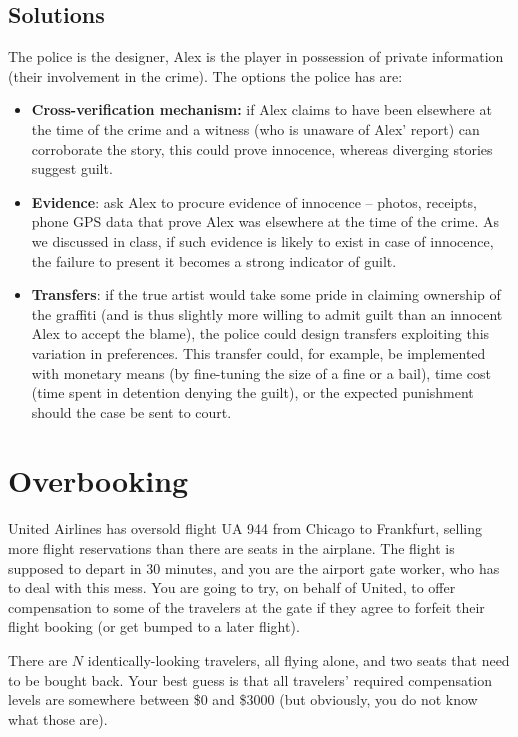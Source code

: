 \documentclass[a4paper]{article}
\begin{document}
\subsection*{Solutions}
The police is the designer, Alex is the player in possession of private information (their involvement in the crime).
The options the police has are:
\begin{itemize}
	\item \textbf{Cross-verification mechanism:} if Alex claims to have been elsewhere at the time of the crime and a witness (who is unaware of Alex' report) can corroborate the story, this could prove innocence, whereas diverging stories suggest guilt. 
	\item \textbf{Evidence}: ask Alex to procure evidence of innocence -- photos, receipts, phone GPS data that prove Alex was elsewhere at the time of the crime. As we discussed in class, if such evidence is likely to exist in case of innocence, the failure to present it becomes a strong indicator of guilt.
	\item \textbf{Transfers}: if the true artist would take some pride in claiming ownership of the graffiti (and is thus slightly more willing to admit guilt than an innocent Alex to accept the blame), the police could design transfers exploiting this variation in preferences. This transfer could, for example, be implemented with monetary means (by fine-tuning the size of a fine or a bail), time cost (time spent in detention denying the guilt), or the expected punishment should the case be sent to court.
\end{itemize}
\fi 




\section{Overbooking}

United Airlines has oversold flight UA 944 from Chicago to Frankfurt, selling more flight reservations than there are seats in the airplane. The flight is supposed to depart in 30 minutes, and you are the airport gate worker, who has to deal with this mess. You are going to try, on behalf of United, to offer compensation to some of the travelers at the gate if they agree to forfeit their flight booking (or get bumped to a later flight).

There are $N$ identically-looking travelers, all flying alone, and two seats that need to be bought back. Your best guess is that all travelers' required compensation levels are somewhere between \$0 and \$3000 (but obviously, you do not know what those are).
\end{document}
